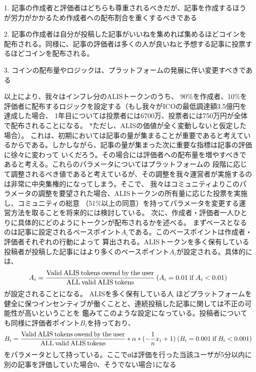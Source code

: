 \documentclass{jsarticle}
\begin{document}
1. 記事の作成者と評価者はどちらも尊重されるべきだが、記事を作成するほうが労力がかかるため作成者への配布割合を重くするべきである 

2. 記事の作成者は自分が投稿した記事がいいねを集めれば集めるほどコインを配布される。同様に、記事の評価者は多くの人が良いねと予想する記事に投票するほどコインを配布される。 

3. コインの配布量やロジックは、プラットフォームの発展に伴い変更すべきである 

以上により、我々はインフレ分のALISトークンのうち、
90\%を作成者、10\%を評価者に配布するロジックを設定する（もし我々がICOの最低調達額3.5億円を達成した場合、
1年目については投票者には6700万、投票者には750万円が全体で配布されることになる。 *ただし、ALISの価値が全く変動しないと仮定した場合）。
これは、初期においては記事の量が集まることが重要であると考えているからである。しかしながら、記事の量が集まった次に重要な指標は記事の評価に徐々に変わって
いくだろう。その場合には評価者への配布量を増やすべきであると考える。これらのパラメータについてはプラットフォームの
段階に応じて調整されるべき値であると考えているが、その調整を我々運営者が実施するのは非常に中央集権的になってしまう。そこで、
我々はコミュニティよりこのパラメータの調整を要望された場合、ALISトークンの所有量に応じた投票を実施し、コミュニティの総意
（51\%以上の同意）を持ってパラメータを変更する運営方法を取ることを将来的には検討している。
次に、作成者・評価者一人ひとりに具体的にどのようにトークンが配布されるかを述べる。
まずベースとなるのは記事に設定されるベースポイント$A_{i}$である。このベースポイントは作成者・評価者それぞれの行動によって
算出される。ALISトークンを多く保有している投稿者が投稿した記事にはより多くのベースポイント$A_{i}$が設定される。具体的には、
\begin{align}
A_{i} = \frac{\rm Valid\:ALIS\:tokens\:owend\:by\:the\:user}{\rm ALL\:valid\:ALIS\:tokens}\:(A_{i} = 0.01\:{\rm if}\:A_{i} < 0.01)
\end{align}
が設定されることになる。 ALISを多く保有している人
ほどプラットフォームを健全に保つインセンティブが働くことと、連続投稿した記事に関しては不正の可能性が高いということを
鑑みてこのような設定になっている。投稿者についても同様に評価者ポイント$B_{i}$を持っており、
\begin{align}
B_{i} = \frac{\rm Valid\:ALIS\:tokens\:owend\:by\:the\:user}{\rm ALL\:valid\:ALIS\:tokens} * \alpha * (-\frac{1}{n}x_{i}+1) \:(B_{i} = 0.001 {\rm\:if\:} B_{i} < 0.001)
\end{align}
をパラメータとして持っている。ここでαは評価を行った当該ユーザが5分以内に別の記事を評価していた場合0、そうでない場合1になる
\end{document}
